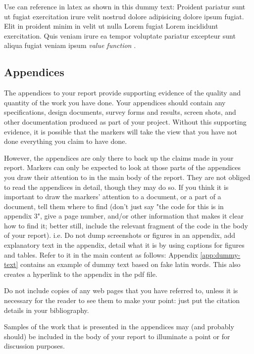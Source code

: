 \documentclass[a4paper, notitlepage, 11pt]{article}
\begin{document}
Use can reference in latex as shown in this dummy text: Proident pariatur sunt ut fugiat exercitation irure velit nostrud dolore adipisicing dolore ipsum fugiat. Elit in proident minim in velit ut nulla Lorem fugiat Lorem incididunt exercitation. Quis veniam irure ea tempor voluptate pariatur excepteur sunt aliqua fugiat veniam ipsum \emph{value function}  \citep{Sutton2018}.


\subsection{Appendices}

The appendices to your report provide supporting evidence of the quality and quantity of the 
work you have done. Your appendices should contain any specifications, design documents, 
survey  forms  and  results,  screen  shots,  and  other  documentation  produced  as  part  of  your 
project. Without this supporting evidence, it is possible that the markers will take the view that 
you have not done everything you claim to have done.  

However, the  appendices are only  there to back up  the claims made in your report. Markers 
can only be expected to look at those parts of the appendices you draw their attention to in the 
main body of the report. They are not obliged to read the appendices in detail, though they may 
do so. If you think it is important to draw the markers' attention to a document, or a part of a 
document,  tell them where  to find (don't  just say "the code for  this is in  appendix 3", give a 
page number, and/or other information that makes it clear how to find it; better still, include 
the relevant fragment of the code in the body of your report).  i.e. Do not dump screenshots or figures in an appendix, add explanatory text in the appendix, detail what it is by using captions for figures and tables.  Refer to it in the main content as follows: Appendix \ref{app:dummy-text} contains an example of dummy text based on fake latin words.  This also creates a hyperlink to the appendix in the pdf file.


Do not include copies of any web pages that you have referred to, unless it is necessary for the 
reader to see them to make your point: just put the citation details in your bibliography.  

Samples of the work that is presented in the appendices may (and probably should) be included 
in the body of your report to illuminate a point or for discussion purposes. 
\end{document}
